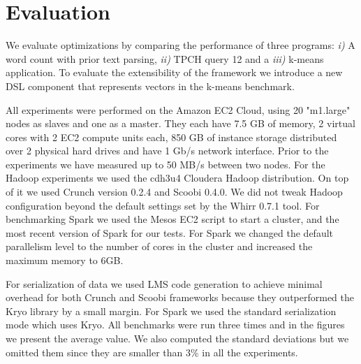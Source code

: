 \section{Evaluation}
\label{sec:evaluation}

We evaluate \tool optimizations by comparing the performance of three programs: \emph{i)} A word count with prior text parsing, \emph{ii)} TPCH \cite{tpch} query 12 and a  \emph{iii)} k-means application. To evaluate the extensibility of the framework we introduce a new DSL component that represents vectors in the k-means benchmark.

All experiments were performed on the Amazon EC2 Cloud, using 20 "m1.large" nodes as slaves and one as a master. They each have 7.5 GB of memory, 2 virtual cores with 2 EC2 compute units each, 850 GB of instance storage distributed over 2 physical hard drives and have 1 Gb/s network interface. Prior to the experiments we have measured up to 50 MB/s between two nodes. For the Hadoop experiments we used the cdh3u4 Cloudera Hadoop distribution. On top of it we used Crunch version 0.2.4 and Scoobi 0.4.0. We did not tweak Hadoop configuration beyond the default settings set by the Whirr 0.7.1  tool. For benchmarking Spark we used the Mesos \cite{hindman_mesos:_2011} EC2 script to start a cluster, and the most recent version of Spark for our tests. For Spark we changed the default parallelism level to the number of cores in the cluster and increased the maximum memory to 6GB. 



For serialization of data we used LMS code generation to achieve minimal overhead for both Crunch and Scoobi frameworks because they outperformed the Kryo  library by a small margin. For Spark we used the standard serialization mode which uses Kryo. All benchmarks were run three times and in the figures we present the average value. We also computed the standard deviations but we omitted them since they are smaller than 3\% in all the experiments.


